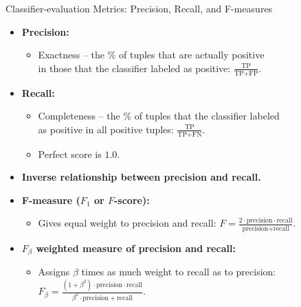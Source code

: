 \begin{frame}{Classifier-evaluation Metrics: Precision, Recall, and F-measures}
  \begin{itemize}
  \item \textbf{Precision:}
    \begin{itemize}
    \item Exactness -- the $\%$ of tuples that are actually positive \\
      in those that the classifier labeled as positive: $\frac{\text{TP}}{\text{TP} + \text{FP}}$.
    \end{itemize}
  \item \textbf{Recall:}
    \begin{itemize}
    \item Completeness -- the $\%$ of tuples that the classifier labeled \\
      as positive in all positive tuples: $\frac{\text{TP}}{\text{TP} + \text{FN}}$.
    \item Perfect score is $1.0$.
    \end{itemize}
  \item \textbf{Inverse relationship between precision and recall.}%
  \item \textbf{F-measure ($F_1$ or $F$-score):}
    \begin{itemize}
    \item Gives equal weight to precision and recall: $F = \frac{2\cdot\text{precision}\cdot \text{recall}}{\text{precision} + \text{recall}}$.
    \end{itemize}
  \item \textbf{$F_\beta$ weighted measure of precision and recall:}
    \begin{itemize}
    \item Assigns $\beta$ times as much weight to recall as to precision: $F_\beta = \frac{(1+\beta^2) \cdot \text{precision} \cdot \text{recall}}{\beta^2 \cdot \text{precision} + \text{recall}}$.
    \end{itemize}
  \end{itemize} %
\end{frame}

